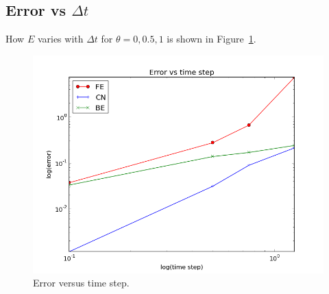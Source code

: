 \documentclass[twoside]{article}
\begin{document}
\subsection{Error vs $\Delta t$}



How $E$ varies with $\Delta t$ for $\theta=0,0.5,1$
is shown in Figure~\ref{fig:E}.


\begin{figure}[!ht]
  \centerline{\includegraphics[width=0.9\linewidth]{error.png}}
  \caption{
  Error versus time step. \label{fig:E}
  }
\end{figure}

\printindex
\end{document}
